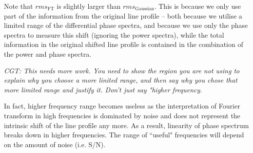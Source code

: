 Note that $rms_\text{FT}$ is slightly larger than $rms_\text{Gaussian}$.
This is because we only use part of the information from the original line profile -- both because we utilise a limited range of the
differential phase spectra, and because we use only the phase spectra to measure this shift (ignoring the power spectra), while the total information in the original shifted line profile is contained in the combination of the power and phase spectra. 

{\em CGT: This needs more work. You need to show the region you are not using to explain why you choose a more linited range, and
then say why you chose that more limited range and justify it. Don't just say "higher frequency}.

In fact, higher frequency range becomes useless 
as the interpretation of Fourier transform in high frequencies is dominated by noise and does not represent the 
intrinsic shift of the line profile any more. As a result, linearity of phase spectrum breaks down in higher frequencies. 
The range of ``useful" frequencies will depend on the amount of noise (i.e. S/N). 


